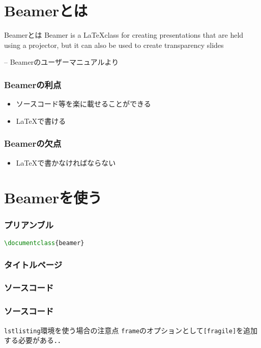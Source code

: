 \documentclass[dvipdfmx,uplatex,a4j,12pt]{beamer}
\newcommand\putsource[1]{
    \begin{frame}
        \frametitle{ソースコード}

        
    \end{frame}
}
\newcommand\generateslides[1]{
    
    \putsource{#1.tex}
}
\begin{document}
\section{Beamerとは}

\begin{frame}{Beamerとは}
    Beamer is a \LaTeX class for creating presentations that are held using a projector, but it can also be used to create transparency slides

    -- Beamerのユーザーマニュアルより\cite{beamer_manual}
\end{frame}

\begin{frame}
    \frametitle{Beamerの利点}

    \begin{itemize}
        \item ソースコード等を楽に載せることができる
        \item \LaTeX で書ける
    \end{itemize}
\end{frame}

\begin{frame}
    \frametitle{Beamerの欠点}

    \begin{itemize}
        \item \LaTeX で書かなければならない
    \end{itemize}
\end{frame}

\section{Beamerを使う}
\begin{frame}[fragile]
    \frametitle{プリアンブル}
    \begin{lstlisting}[language={tex}]
\documentclass{beamer}
    \end{lstlisting}
\end{frame}

\begin{frame}[fragile]
    \frametitle{タイトルページ}
    
\end{frame}

\generateslides{equation}
\generateslides{code}

\begin{frame}{\lstinline{lstlisting}環境を使う場合の注意点}
    \lstinline{frame}のオプションとして\lstinline{[fragile]}を追加する必要がある．\cite{why_fragile}．
\end{frame}
\end{document}
